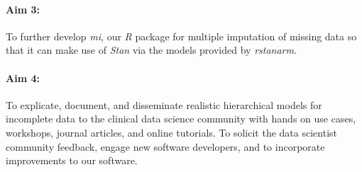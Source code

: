 \documentclass[11pt,notitlepage]{article}
\begin{document}
\paragraph*{Aim 3:} To further develop \textit{mi}, our \textit{R} package for multiple imputation
of missing data so that it can make use of \textit{Stan} via the models provided by \textit{rstanarm}.

\paragraph*{Aim 4:} To explicate, document, and disseminate realistic hierarchical models for incomplete data 
to the clinical data science community with hands on use cases, workshops, journal articles, and 
online tutorials. To solicit the data scientist community feedback, engage new 
software developers, and to incorporate improvements to our software.
\end{document}
